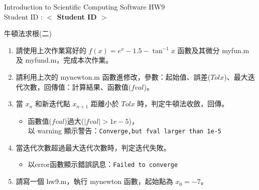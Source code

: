 \documentclass[12pt,a4paper]{article}
\newcommand{\placeholder}[1]{\textbf{$<$ #1 $>$}}
\newcommand{\idnumber}{\placeholder{Student ID}}
\begin{document}
\begin{CJK}{UTF8}{bsmi}
\begin{flushleft}Introduction to Scientific Computing Software HW9
\\Student ID : \idnumber{}\end{flushleft}

牛頓法求根(二)
\begin{enumerate}
\item 請使用上次作業寫好的 $f(x)=e^x-1.5-\tan^{-1}x$ 函數及其微分 myfun.m 及 myfund.m，完成本次作業。
\item 請利用上次的 mynewton.m 函數進修改，參數：起始值、誤差($Tolx$)、最大迭代次數，回傳值：計算結果、函數值($fval$)。
\item 當 $x_n$ 和新迭代點 $x_{n+1}$ 距離小於 $Tolx$ 時，判定牛頓法收斂，回傳。
\begin{itemize}
\item 函數值($fval$)過大($|fval|>1e-5$)，\\以 warning 顯示警告：\texttt{Converge,but fval larger than 1e-5}
\end{itemize}
\item 當迭代次數超過最大迭代次數時，判定迭代失敗。
\begin{itemize}
\item 以error函數顯示錯誤訊息：\texttt{Failed to converge}
\end{itemize}
\item 請寫一個 hw9.m，執行 mynewton 函數，起始點為 $x_0=-7$。

\end{enumerate}
\end{CJK}
\end{document}
